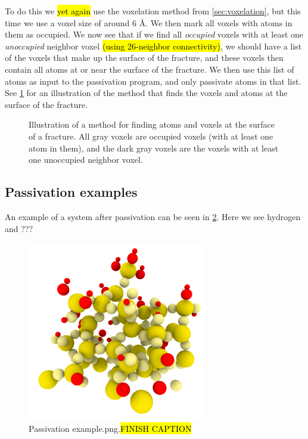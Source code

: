 To do this we \hl{yet again} use the voxelation method from \ref{sec:voxelation}, but this time we use a voxel size of around $6\text{ \AA}$. We then mark all voxels with atoms in them as occupied. We now see that if we find all \emph{occupied} voxels with at least one \emph{unoccupied} neighbor voxel \hl{(using 26-neighbor connectivity)}, we should have a list of the voxels that make up the surface of the fracture, and these voxels then contain all atoms at or near the surface of the fracture. We then use this list of atoms as input to the passivation program, and only passivate atoms in that list. See \cref{fig:find_surface_atoms} for an illustration of the method that finds the voxels and atoms at the surface of the fracture.
%
\begin{figure}[htpb]%
    \centering%
    \caption{%
        Illustration of a method for finding atoms and voxels at the surface of a fracture. All gray voxels are occupied voxels (with at least one atom in them), and the dark gray voxels are the voxels with at least one unoccupied neighbor voxel. %
    }%
    \label{fig:find_surface_atoms}%
\end{figure}%

\subsection{Passivation examples}
An example of a system after passivation can be seen in \cref{fig:passivation_example}. Here we see hydrogen and ???
%
\begin{figure}[htpb]%
    \centering%
    \includegraphics[width=0.7\textwidth]{images/passivation/passivation_example04.png}%
    \caption{
        Passivation example.png.\hl{FINISH CAPTION}%
    }%
    \label{fig:passivation_example}%
\end{figure}%

